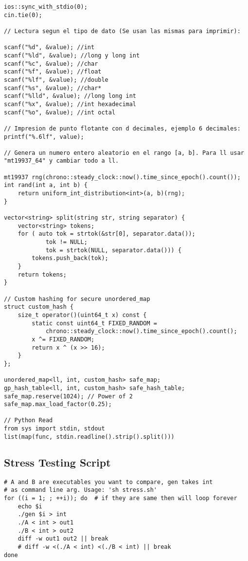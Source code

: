 \documentclass[10pt,letterpaper,twocolumn,twosided]{article}
\begin{document}
\begin{lstlisting}
ios::sync_with_stdio(0);
cin.tie(0);

// Lectura segun el tipo de dato (Se usan las mismas para imprimir):

scanf("%d", &value); //int
scanf("%ld", &value); //long y long int
scanf("%c", &value); //char 
scanf("%f", &value); //float
scanf("%lf", &value); //double
scanf("%s", &value); //char*
scanf("%lld", &value); //long long int
scanf("%x", &value); //int hexadecimal
scanf("%o", &value); //int octal

// Impresion de punto flotante con d decimales, ejemplo 6 decimales:
printf("%.6lf", value);

// Genera un numero entero aleatorio en el rango [a, b]. Para ll usar "mt19937_64" y cambiar todo a ll.

mt19937 rng(chrono::steady_clock::now().time_since_epoch().count());
int rand(int a, int b) {
    return uniform_int_distribution<int>(a, b)(rng);
}

vector<string> split(string str, string separator) {
    vector<string> tokens;
    for ( auto tok = strtok(&str[0], separator.data());
            tok != NULL;
            tok = strtok(NULL, separator.data())) {
        tokens.push_back(tok);
    }
    return tokens;
}

// Custom hashing for secure unordered_map
struct custom_hash {
    size_t operator()(uint64_t x) const {
        static const uint64_t FIXED_RANDOM = 
            chrono::steady_clock::now().time_since_epoch().count();
        x ^= FIXED_RANDOM;
        return x ^ (x >> 16);
    }
};

unordered_map<ll, int, custom_hash> safe_map;
gp_hash_table<ll, int, custom_hash> safe_hash_table;
safe_map.reserve(1024); // Power of 2
safe_map.max_load_factor(0.25);

// Python Read
from sys import stdin, stdout
list(map(func, stdin.readline().strip().split()))
\end{lstlisting}

\subsection{Stress Testing Script}
\begin{lstlisting}
# A and B are executables you want to compare, gen takes int
# as command line arg. Usage: 'sh stress.sh'
for ((i = 1; ; ++i)); do  # if they are same then will loop forever
    echo $i
    ./gen $i > int
    ./A < int > out1
    ./B < int > out2
    diff -w out1 out2 || break
    # diff -w <(./A < int) <(./B < int) || break
done
\end{lstlisting}
\end{document}
